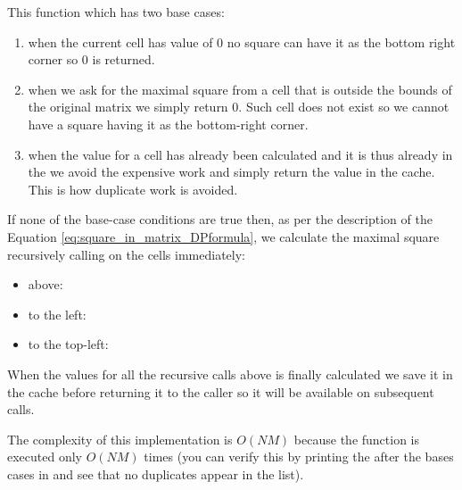 This function which has two base cases:
\begin{enumerate}
	\item when the current cell has value of $0$ no square can have it as the bottom
	right corner so $0$ is returned.
	\item when we ask for the maximal square from a cell that is outside the
	bounds of the original matrix we simply return $0$. Such cell does not
	exist so we cannot have a square having it as the bottom-right corner. 
	\item when the value for a cell has already been calculated and it is thus
	already in the  we avoid the expensive work and simply return
	the value in the cache. This is how duplicate work is avoided.
\end{enumerate}
If none of the base-case conditions are true then, as per the description of
the Equation \ref{eq:square_in_matrix_DPformula}, we calculate the maximal square recursively calling
 on the cells immediately:
\begin{itemize}
	\item above:
	\item to the left: 
	\item to the top-left: 
\end{itemize}

When the values for all the recursive calls above is finally calculated we save it in the cache before returning it
to the caller so it will be available on subsequent calls.

The complexity of this implementation is $O(NM)$ because the function
 is executed only $O(NM)$
times (you can verify this by printing the  after the bases cases
in  and see that no duplicates
appear in the list).






